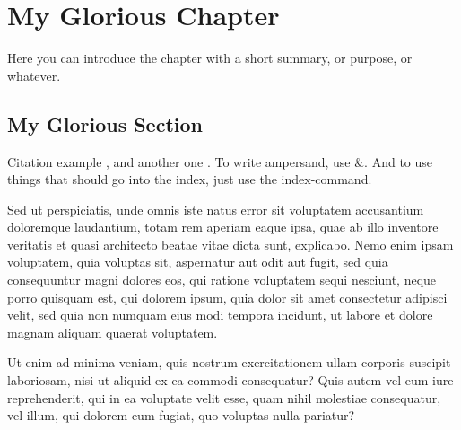 \chapter{My Glorious Chapter}

Here you can introduce the chapter with a short summary, or purpose, or
whatever.

\section{My Glorious Section}

Citation example \cite[p.~42]{TagToUseInLatexDocs}, and another one
\cite{RealDonaldKnuth}. To write ampersand, use
\&{}. And to use things that should go into the index, just use
the index-command.

Sed ut perspiciatis, unde omnis iste natus error sit voluptatem accusantium
doloremque laudantium, totam rem aperiam eaque ipsa, quae ab illo inventore
veritatis et quasi architecto beatae vitae dicta sunt, explicabo. Nemo enim
ipsam voluptatem, quia voluptas sit, aspernatur aut odit aut fugit, sed quia
consequuntur magni dolores eos, qui ratione voluptatem sequi nesciunt, neque
porro quisquam est, qui dolorem ipsum, quia dolor sit amet consectetur adipisci
velit, sed quia non numquam eius modi tempora incidunt, ut labore et dolore
magnam aliquam quaerat voluptatem.

Ut enim ad minima veniam, quis nostrum exercitationem ullam corporis suscipit
laboriosam, nisi ut aliquid ex ea commodi consequatur? Quis autem vel eum iure
reprehenderit, qui in ea voluptate velit esse, quam nihil molestiae
consequatur, vel illum, qui dolorem eum fugiat, quo voluptas nulla pariatur?

